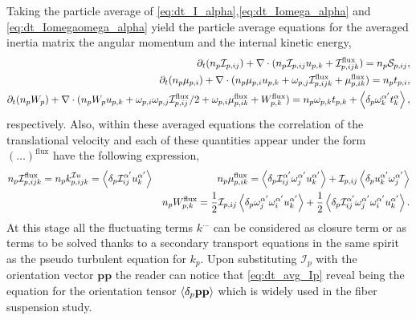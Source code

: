 Taking the particle average of \ref{eq:dt_I_alpha},\ref{eq:dt_Iomega_alpha} and \ref{eq:dt_Iomegaomega_alpha} yield the particle average equations for the averaged inertia matrix the angular momentum and the internal kinetic energy, 
\begin{align}
    \label{eq:dt_avg_Ip}
    \partial_t (n_p\mathcal{I}_{p,ij})
    + \mathbf{\nabla}\cdot (n_p\mathcal{I}_{p,ij} u_{p,k}
    + \mathcal{I}^\text{flux}_{p,ijk})
    = n_p \mathcal{S}_{p,ij},\\ 
    \label{eq:dt_avg_mup}
    \partial_t (
    n_p \mu_{p,i}
    )
    + \mathbf{\nabla}\cdot (
        n_p \mu_{p,i}u_{p,k}
    +  \omega_{p,j} \mathcal{I}^\text{flux}_{p,ijk}
    + \mu_{p,ik}^\text{flux}
    )
    = n_p t_{p,i},\\
    \partial_t (n_p W_p)
    + \mathbf{\nabla}\cdot  (
        n_p W_p u_{p,k}
        + \omega_{p,i} \omega_{p,j}
        \mathcal{I}_{p,ij}^\text{flux}/2
        + \omega_{p,i}\mu_{p,ik}^\text{flux}
    + W_{p,k}^\text{flux}
    )
    = 
    n_p \omega_{p,k} t_{p,k}
    +  \left<\delta_p \omega_k^{\alpha'} t^\alpha_k\right>,
\end{align}
respectively. 
Also, within these averaged equations the correlation of the translational velocity and each of these quantities  appear under the form $(\ldots)^\text{flux}$ have the following expression, 
\begin{align*}
    n_p \mathcal{I}_{p,ijk}^\text{flux}
    = n_p k_{p,ijk}^{\mathcal{I}u}
    = 
    \left<\delta_p \mathcal{I}^{\alpha'}_{ij} u_{k}^{\alpha'}\right>
    &&
    n_p \mu_{p,ik}^\text{flux}
    = 
    \left<\delta_p \mathcal{I}^{\alpha'}_{ij} \omega^{\alpha'}_j u_{k}^{\alpha'}\right> 
    + \mathcal{I}_{p,ij} \left<\delta_p u_k^{\alpha'}\omega_j^{\alpha'}\right>\\
    && n_p W_{p,k}^\text{flux}
    = \frac{1}{2}\mathcal{I}_{p,ij}
    \left<\delta_p 
        \omega_j^{\alpha'}
        \omega_i^{\alpha'}
        u_k^{\alpha'}
    \right>
    + \frac{1}{2}\left<\delta_p 
        \mathcal{I}_{ij}^{\alpha'}
        \omega_j^{\alpha'}
        \omega_i^{\alpha'}
        u_k^{\alpha'}
    \right>.
\end{align*}
At this stage all the fluctuating terms $k^{\ldots}$ can be considered as closure term or as terms to be solved thanks to a secondary transport equations in the same spirit as the pseudo turbulent equation for $k_p$.
Upon substituting $\mathcal{I}_p$ with the orientation vector $\textbf{pp}$ the reader can notice that \ref{eq:dt_avg_Ip} reveal being the equation for the orientation tensor $\left<\delta_p \textbf{pp}\right>$ \citep{wang2008objective} which is widely used in the fiber suspension study. 
